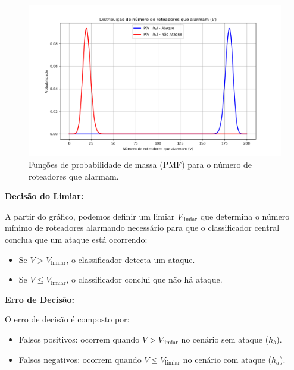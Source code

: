 \documentclass[12 pt]{article}
\begin{document}
\begin{enumerate}
    \begin{figure}[H]
        \centering
        \includegraphics[width=\textwidth]{fig/item_9.png}
        \caption{Funções de probabilidade de massa (PMF) para o número de roteadores que alarmam.}
        \label{fig:pmf}
    \end{figure}

    \begin{tcolorbox}[colback=white, colframe=black, title=Resposta (continuação):]
        
        \textbf{Decisão do Limiar:}
        
        A partir do gráfico, podemos definir um limiar \( V_{\text{limiar}} \) que determina o número mínimo de roteadores alarmando necessário para que o classificador central conclua que um ataque está ocorrendo:
        \begin{itemize}
            \item Se \( V > V_{\text{limiar}} \), o classificador detecta um ataque.
            \item Se \( V \leq V_{\text{limiar}} \), o classificador conclui que não há ataque.
        \end{itemize}
        
        \textbf{Erro de Decisão:}
        
        O erro de decisão é composto por:
        \begin{itemize}
            \item Falsos positivos: ocorrem quando \( V > V_{\text{limiar}} \) no cenário sem ataque (\( h_b \)).
            \item Falsos negativos: ocorrem quando \( V \leq V_{\text{limiar}} \) no cenário com ataque (\( h_a \)).
        \end{itemize}
        

\end{tcolorbox}
\end{enumerate}
\end{document}
